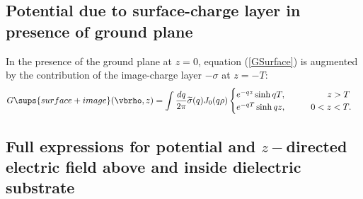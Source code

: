 \documentclass[letterpaper]{article}
\renewcommand{\wt}{\widetilde}
\begin{document}
\subsection*{Potential due to surface-charge layer in presence of 
             ground plane}

In the presence of the ground plane at $z=0$, equation (\ref{GSurface})
is augmented by the contribution of the image-charge
layer $-\sigma$ at $z=-T$:
\begin{align}
G\sups{surface+image}(\vbrho,z)
 &=\int \frac{dq}{2\pi} \wt \sigma(q) J_0(q\rho)
 \begin{cases} e^{-qz}\sinh qT, \qquad &\hphantom{0<}\,\,z>T \\
               e^{-qT}\sinh qz, \qquad &0<z<T.
 \end{cases}
\label{GSurfaceImage}
\end{align}


\subsection{Full expressions for potential and $z-$directed electric
            field above and inside dielectric substrate}
\end{document}
